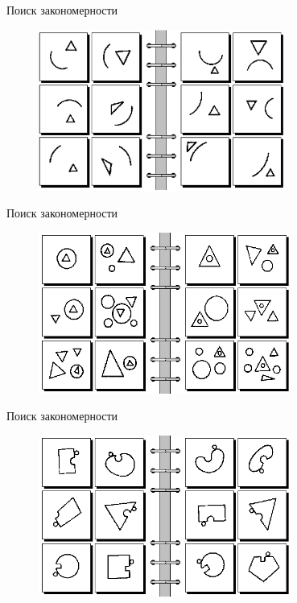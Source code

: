\documentclass[10pt]{beamer}
\begin{document}
\begin{frame}{Поиск закономерности}
	\begin{figure}[htbp]
	  \includegraphics[height=150pt, keepaspectratio = true]{images/bongard40}   
	\end{figure}
\end{frame}

\begin{frame}{Поиск закономерности}
	\begin{figure}[htbp]
	  \includegraphics[height=150pt, keepaspectratio = true]{images/bongard47}   
	\end{figure}
\end{frame}

\begin{frame}{Поиск закономерности}
	\begin{figure}[htbp]
	  \includegraphics[height=150pt, keepaspectratio = true]{images/bongard55}   
	\end{figure}
\end{frame}
\end{document}
